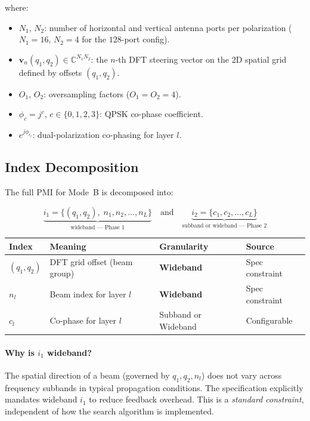 \documentclass[12pt, a4paper]{article}
\newcommand{\bv}{\mathbf{v}}
\newcommand{\C}{\mathbb{C}}
\begin{document}
where:
\begin{itemize}
    \item $N_1$, $N_2$: number of horizontal and vertical antenna ports
          per polarization ($N_1 = 16$, $N_2 = 4$ for the $128$-port config).
    \item $\bv_n(q_1, q_2) \in \C^{N_1 N_2}$: the $n$-th DFT steering vector
          on the 2D spatial grid defined by offsets $(q_1, q_2)$.
    \item $O_1$, $O_2$: oversampling factors ($O_1 = O_2 = 4$).
    \item $\phi_c = j^c$, $c \in \{0,1,2,3\}$: QPSK co-phase coefficient.
    \item $e^{j\phi_{c_l}}$: dual-polarization co-phasing for layer $l$.
\end{itemize}

\subsection{Index Decomposition}

The full PMI for Mode~B is decomposed into:

\begin{equation}
    \underbrace{i_1 = \{(q_1, q_2),\; n_1, n_2, \ldots, n_L\}}_{\text{wideband — Phase~1}}
    \quad\text{and}\quad
    \underbrace{i_2 = \{c_1, c_2, \ldots, c_L\}}_{\text{subband or wideband — Phase~2}}
\end{equation}

\begin{center}
\begin{tabular}{llll}
    \toprule
    Index & Meaning & Granularity & Source \\
    \midrule
    $(q_1, q_2)$ & DFT grid offset (beam group) & \textbf{Wideband} & Spec constraint \\
    $n_l$ & Beam index for layer $l$ & \textbf{Wideband} & Spec constraint \\
    $c_l$ & Co-phase for layer $l$ & Subband or Wideband & Configurable \\
    \bottomrule
\end{tabular}
\end{center}

\paragraph{Why is $i_1$ wideband?}
The spatial direction of a beam (governed by $q_1, q_2, n_l$) does not vary
across frequency subbands in typical propagation conditions. The specification
explicitly mandates wideband $i_1$ to reduce feedback overhead. This is a
\emph{standard constraint}, independent of how the search algorithm is implemented.
\end{document}
